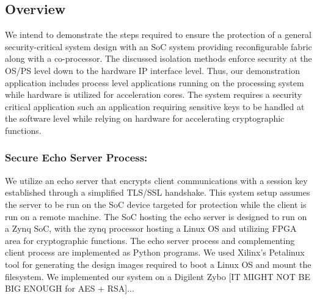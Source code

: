 \documentclass[sigconf]{acmart}
\theoremstyle{plain}
\theoremstyle{remark}
\begin{document}

%


\subsection{Overview}

We intend to demonstrate the steps required to ensure the protection of a general security-critical system design with an SoC system providing reconfigurable fabric along with a co-processor. The discussed isolation methods enforce security at the OS/PS level down to the hardware IP interface level. Thus, our demonstration application includes process level applications running on the processing system while hardware is utilized for acceleration cores. The system requires a security critical application such an application requiring sensitive keys to be handled at the software level while relying on hardware for accelerating cryptographic functions.

\subsubsection{Secure Echo Server Process:}
We utilize an echo server that encrypts client communications with a session key established through a simplified TLS/SSL handshake. This system setup assumes the server to be run on the SoC device targeted for protection while the client is run on a remote machine. The SoC hosting the echo server is designed to run on a Zynq SoC, with the zynq processor hosting a Linux OS and utilizing FPGA area for cryptographic functions. The echo server process and complementing client process are implemented as Python programs. We used Xilinx's Petalinux tool for generating the design images required to boot a Linux OS and mount the filesystem. We implemented our system on a Digilent Zybo [IT MIGHT NOT BE BIG ENOUGH for AES + RSA]...
\end{document}
